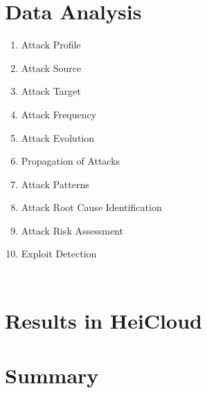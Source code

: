 \begin{table}[h]
    \centering
    \caption{}
    \begin{tabularx}{\linewidth}{l}
        \toprule
        \bottomrule
    \end{tabularx}
    \label{tab:overview-honeypots}
\end{table}


\section{Data Analysis}

\begin{enumerate}
    \item Attack Profile
    \item Attack Source
    \item Attack Target
    \item Attack Frequency
    \item Attack Evolution
    \item Propagation of Attacks
    \item Attack Patterns
    \item Attack Root Cause Identification
    \item Attack Risk Assessment
    \item Exploit Detection
\end{enumerate}

\begin{table}[h]
    \centering
    \caption{}
    \begin{tabularx}{\linewidth}{l}
        \toprule
        \bottomrule
    \end{tabularx}
    \label{tab:overview-data-analysis}
\end{table}


\section{Results in HeiCloud}


\section{Summary}